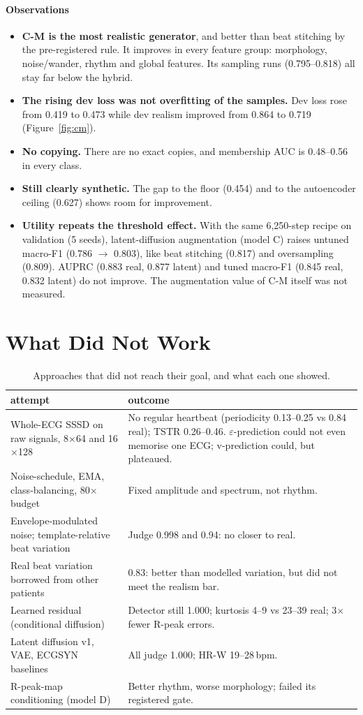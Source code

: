 \documentclass[11pt,a4paper]{article}
\newcommand{\obs}{\paragraph{Observations}}
\begin{document}
\obs
\begin{itemize}
\item \textbf{C-M is the most realistic generator}, and better than beat stitching by the pre-registered rule. It
  improves in every feature group: morphology, noise/wander, rhythm and global features. Its sampling runs
  (0.795--0.818) all stay far below the hybrid.
\item \textbf{The rising dev loss was not overfitting of the samples.} Dev loss rose from 0.419 to 0.473 while dev
  realism improved from 0.864 to 0.719 (Figure~\ref{fig:cm}).
\item \textbf{No copying.} There are no exact copies, and membership AUC is 0.48--0.56 in every class.
\item \textbf{Still clearly synthetic.} The gap to the floor (0.454) and to the autoencoder ceiling (0.627) shows room
  for improvement.
\item \textbf{Utility repeats the threshold effect.} With the same 6,250-step recipe on validation (5 seeds),
  latent-diffusion augmentation (model C) raises untuned macro-F1 (0.786 $\rightarrow$ 0.803), like beat stitching
  (0.817) and oversampling (0.809). AUPRC (0.883 real, 0.877 latent) and tuned macro-F1 (0.845 real, 0.832 latent)
  do not improve. The augmentation value of C-M itself was not measured.
\end{itemize}

\section{What Did Not Work}\label{sec:fail}
\begin{table}[H]\centering\small
\begin{tabular}{p{5.0cm}p{9.6cm}}\toprule
attempt & outcome \\\midrule
Whole-ECG SSSD on raw signals, 8$\times$64 and 16$\times$128 & No regular heartbeat (periodicity 0.13--0.25 vs 0.84 real); TSTR 0.26--0.46. $\varepsilon$-prediction could not even memorise one ECG; v-prediction could, but plateaued. \\
Noise-schedule, EMA, class-balancing, 80$\times$ budget & Fixed amplitude and spectrum, not rhythm. \\
Envelope-modulated noise; template-relative beat variation & Judge 0.998 and 0.94: no closer to real. \\
Real beat variation borrowed from other patients & 0.83: better than modelled variation, but did not meet the realism bar. \\
Learned residual (conditional diffusion) & Detector still 1.000; kurtosis 4--9 vs 23--39 real; 3$\times$ fewer R-peak errors. \\
Latent diffusion v1, VAE, ECGSYN baselines & All judge 1.000; HR-W 19--28\,bpm. \\
R-peak-map conditioning (model D) & Better rhythm, worse morphology; failed its registered gate. \\\bottomrule
\end{tabular}
\caption{Approaches that did not reach their goal, and what each one showed.}
\end{table}
\end{document}
